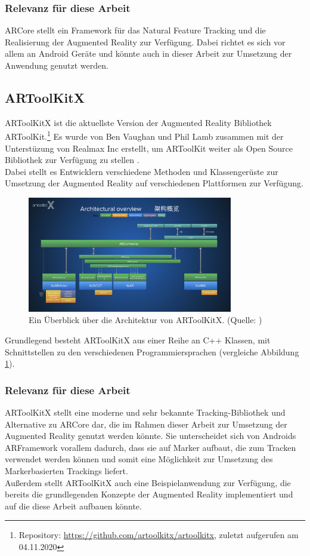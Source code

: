 \subsubsection{Relevanz für diese Arbeit}
ARCore stellt ein Framework für das Natural Feature Tracking und die Realisierung der Augmented Reality zur Verfügung. Dabei richtet es sich vor allem an Android Geräte und könnte auch in dieser Arbeit zur Umsetzung der Anwendung genutzt werden.

\subsection{ARToolKitX}\label{sec:artoolkitx}
ARToolKitX ist die aktuellste Version der Augmented Reality Bibliothek ARToolKit.\footnote{Repository: \url{https://github.com/artoolkitx/artoolkitx}, zuletzt aufgerufen am 04.11.2020} Es wurde von Ben Vaughan und Phil Lamb zusammen mit der Unterstüzung von Realmax Inc erstellt, um ARToolKit weiter als Open Source Bibliothek zur Verfügung zu stellen \citep{artoolkitx:startseite}. \\
Dabei stellt es Entwicklern verschiedene Methoden und Klassengerüste zur Umsetzung der Augmented Reality auf verschiedenen Plattformen zur Verfügung.\\
\begin{figure}
\centering
\includegraphics[width=0.8\textwidth]{Abbildungen/artoolkitx-architecture.png}
\caption[ARToolKitX: Architektur]{Ein Überblick über die Architektur von ARToolKitX. (Quelle: \cite{artoolkitx:architecture})}
\label{fig:artoolkitx-architecture}
\end{figure}
Grundlegend besteht ARToolKitX aus einer Reihe an C++ Klassen, mit Schnittstellen zu den verschiedenen Programmiersprachen (vergleiche Abbildung \ref{fig:artoolkitx-architecture}).

\subsubsection{Relevanz für diese Arbeit}
ARToolKitX stellt eine moderne und sehr bekannte Tracking-Bibliothek und Alternative zu ARCore dar, die im Rahmen dieser Arbeit zur Umsetzung der Augmented Reality genutzt werden könnte. Sie unterscheidet sich von Androids ARFramework vorallem dadurch, dass sie auf Marker aufbaut, die zum Tracken verwendet werden können und somit eine Möglichkeit zur Umsetzung des Markerbasierten Trackings liefert.\\
Außerdem stellt ARToolKitX auch eine Beispielanwendung zur Verfügung, die bereits die grundlegenden Konzepte der Augmented Reality implementiert und auf die diese Arbeit aufbauen könnte.


